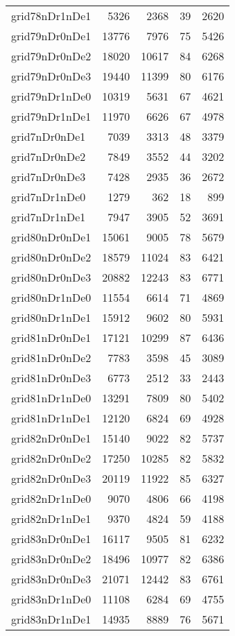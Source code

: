 \documentclass[../../../thesis.tex]{subfiles}
\begin{document}
\begin{longtable}{lrrrr}
grid78nDr1nDe1 & 5326 & 2368 & 39 & 2620 \\
grid79nDr0nDe1 & 13776 & 7976 & 75 & 5426 \\
grid79nDr0nDe2 & 18020 & 10617 & 84 & 6268 \\
grid79nDr0nDe3 & 19440 & 11399 & 80 & 6176 \\
grid79nDr1nDe0 & 10319 & 5631 & 67 & 4621 \\
grid79nDr1nDe1 & 11970 & 6626 & 67 & 4978 \\
grid7nDr0nDe1 & 7039 & 3313 & 48 & 3379 \\
grid7nDr0nDe2 & 7849 & 3552 & 44 & 3202 \\
grid7nDr0nDe3 & 7428 & 2935 & 36 & 2672 \\
grid7nDr1nDe0 & 1279 & 362 & 18 & 899 \\
grid7nDr1nDe1 & 7947 & 3905 & 52 & 3691 \\
grid80nDr0nDe1 & 15061 & 9005 & 78 & 5679 \\
grid80nDr0nDe2 & 18579 & 11024 & 83 & 6421 \\
grid80nDr0nDe3 & 20882 & 12243 & 83 & 6771 \\
grid80nDr1nDe0 & 11554 & 6614 & 71 & 4869 \\
grid80nDr1nDe1 & 15912 & 9602 & 80 & 5931 \\
grid81nDr0nDe1 & 17121 & 10299 & 87 & 6436 \\
grid81nDr0nDe2 & 7783 & 3598 & 45 & 3089 \\
grid81nDr0nDe3 & 6773 & 2512 & 33 & 2443 \\
grid81nDr1nDe0 & 13291 & 7809 & 80 & 5402 \\
grid81nDr1nDe1 & 12120 & 6824 & 69 & 4928 \\
grid82nDr0nDe1 & 15140 & 9022 & 82 & 5737 \\
grid82nDr0nDe2 & 17250 & 10285 & 82 & 5832 \\
grid82nDr0nDe3 & 20119 & 11922 & 85 & 6327 \\
grid82nDr1nDe0 & 9070 & 4806 & 66 & 4198 \\
grid82nDr1nDe1 & 9370 & 4824 & 59 & 4188 \\
grid83nDr0nDe1 & 16117 & 9505 & 81 & 6232 \\
grid83nDr0nDe2 & 18496 & 10977 & 82 & 6386 \\
grid83nDr0nDe3 & 21071 & 12442 & 83 & 6761 \\
grid83nDr1nDe0 & 11108 & 6284 & 69 & 4755 \\
grid83nDr1nDe1 & 14935 & 8889 & 76 & 5671 \\

\end{longtable}
\end{document}
